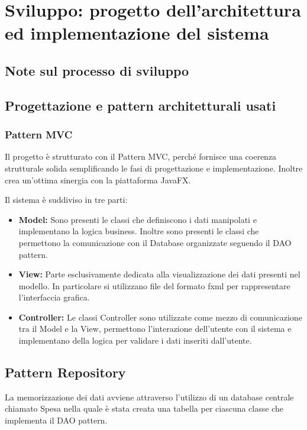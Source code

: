 \documentclass{article}
\begin{document}
\newpage
\section{Sviluppo: progetto dell'architettura ed implementazione del sistema}
\subsection{Note sul processo di sviluppo}

\subsection{Progettazione e pattern architetturali usati}
\subsubsection{Pattern MVC}
Il progetto è strutturato con il Pattern MVC, perché fornisce una coerenza strutturale solida
semplificando le fasi di progettazione e implementazione. Inoltre crea un'ottima sinergia con la
piattaforma JavaFX.

\noindent Il sistema è suddiviso in tre parti:
\begin{itemize}
	\item{\textbf{Model:}
	      Sono presenti le classi che definiscono i dati manipolati
	      e implementano la logica business.
	      Inoltre sono presenti le classi che permettono la comunicazione
	      con il Database organizzate seguendo il DAO pattern.
	      }
	\item{\textbf{View:}
	      Parte esclusivamente dedicata alla visualizzazione dei dati
	      presenti nel modello.
	      In particolare si utilizzano file del formato fxml per rappresentare
	      l'interfaccia grafica.
	      }
	\item{\textbf{Controller:}
	      Le classi Controller sono utilizzate come mezzo di comunicazione
	      tra il Model e la View, permettono l'interazione dell'utente con il
	      sistema e implementano della logica per validare i dati inseriti dall'utente.
	      }
\end{itemize}

\subsection{Pattern Repository}
\noindent La memorizzazione dei dati avviene attraverso l'utilizzo di un database centrale chiamato Spesa nella quale è stata creata una tabella per ciascuna classe che implementa il DAO pattern.
\end{document}

